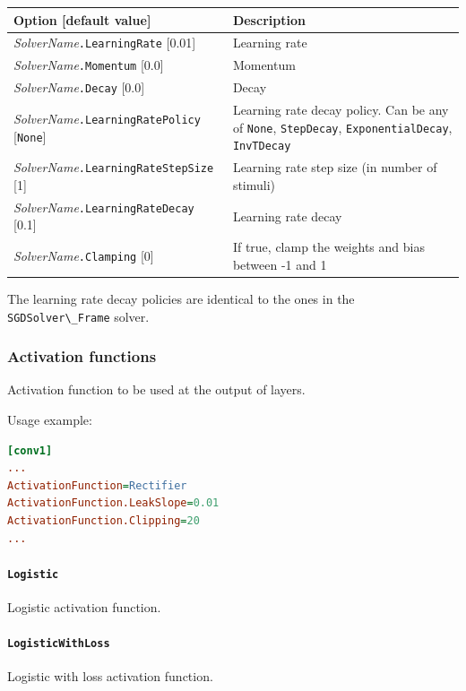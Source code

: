 \documentclass[a4paper,11pt,oneside]{article}
\begin{document}
\begin{center}
 \begin{tabular}{| p{5cm} | p{10cm} | }
 \hline
 Option [default value] & Description\\
 \hline\hline
   \emph{SolverName}\lstinline!.LearningRate! [0.01] & Learning rate \\
   \emph{SolverName}\lstinline!.Momentum! [0.0] & Momentum \\
   \emph{SolverName}\lstinline!.Decay! [0.0] & Decay \\
   \emph{SolverName}\lstinline!.LearningRatePolicy! [\lstinline!None!]
   & Learning rate decay policy. Can be any of
    \lstinline!None!, \lstinline!StepDecay!, \lstinline!ExponentialDecay!, \lstinline!InvTDecay! \\
   \emph{SolverName}\lstinline!.LearningRateStepSize! [1] & Learning rate step
   size (in number of stimuli) \\
   \emph{SolverName}\lstinline!.LearningRateDecay! [0.1] & Learning rate
   decay \\
   \emph{SolverName}\lstinline!.Clamping! [0] & If true, clamp the weights and
    bias between -1 and 1 \\
 \hline
\end{tabular}
\end{center}

The learning rate decay policies are identical to the ones in the \lstinline!SGDSolver\_Frame! solver.



\subsubsection{Activation functions}
Activation function to be used at the output of layers.

Usage example:
\begin{lstlisting}[language=ini]
[conv1]
...
ActivationFunction=Rectifier
ActivationFunction.LeakSlope=0.01
ActivationFunction.Clipping=20
...
\end{lstlisting}

\paragraph{\texorpdfstring{%
\lstinline[basicstyle=\ttfamily\bfseries]!Logistic!}{Logistic}}
Logistic activation function.

\paragraph{\texorpdfstring{%
\lstinline[basicstyle=\ttfamily\bfseries]!LogisticWithLoss!}{LogisticWithLoss}}
Logistic with loss activation function.
\end{document}

